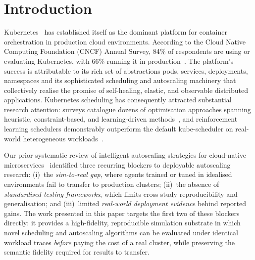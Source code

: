 \documentclass[ASNA,twocolumn]{USG}
\begin{document}

    \maketitle

    \section{Introduction}\label{sec:intro}

    Kubernetes~\cite{Burns2016,Verma2015} has established itself as the
    dominant platform for container orchestration in production cloud environments. According to the Cloud Native Computing Foundation (CNCF) Annual Survey, 84\% of respondents are using or evaluating Kubernetes, with 66\% running it in production~\cite{CNCF2023}. The platform's success is attributable to its rich set of abstractions pods,
    services, deployments, namespaces and its sophisticated scheduling
    and autoscaling machinery that collectively realise the promise of
    self-healing, elastic, and observable distributed applications.
    Kubernetes scheduling has consequently attracted substantial research
    attention: surveys catalogue dozens of optimisation approaches spanning
    heuristic, constraint-based, and learning-driven
    methods~\cite{Li2023}, and reinforcement learning schedulers
    demonstrably outperform the default kube-scheduler on real-world
    heterogeneous workloads~\cite{Xie2024}.

    Our prior systematic review of intelligent autoscaling strategies for
    cloud-native microservices~\cite{Zarai2025} identified three recurring
    blockers to deployable autoscaling research: (i)~the \emph{sim-to-real
    gap}, where agents trained or tuned in idealised environments fail to
    transfer to production clusters; (ii)~the absence of \emph{standardised
    testing frameworks}, which limits cross-study reproducibility and
    generalisation; and (iii)~limited \emph{real-world deployment evidence}
    behind reported gains. The work presented in this paper targets the
    first two of these blockers directly: it provides a high-fidelity,
    reproducible simulation substrate in which novel scheduling and
    autoscaling algorithms can be evaluated under identical workload traces
    \emph{before} paying the cost of a real cluster, while preserving the
    semantic fidelity required for results to transfer.
    
\end{document}
